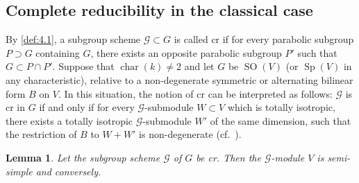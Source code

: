 \documentclass[11pt,a4paper]{article}
\theoremstyle{plain}
\newtheorem{lemma}[theorem]{Lemma}
\theoremstyle{definition}
\DeclareMathOperator{\SO}{SO}
\DeclareMathOperator{\Sp}{Sp}
\begin{document}
\subsection*{Complete reducibility in the classical case}

By \ref{def:4.1}, a subgroup scheme $\mathcal{G} \subset G$ is called cr if for every parabolic subgroup $P \supset G$ containing $G$, there exists an opposite parabolic subgroup $P'$ such that $G \subset P \cap P'$. Suppose that $\operatorname{char}(k) \neq 2$ and let $G$ be $\SO(V)$ (or $\Sp(V)$ in any characteristic), relative to a non-degenerate symmetric or alternating bilinear form $B$ on $V$. In this situation, the notion of cr can be interpreted as follows: $\mathcal{G}$ is cr in $G$ if and only if for every $\mathcal{G}$-submodule $W \subset V$ which is totally isotropic, there exists a totally isotropic $\mathcal{G}$-submodule $W'$ of the same dimension, such that the restriction of $B$ to $W + W'$ is non-degenerate (cf.~\cite[Example~3.3.3, page~206]{S3}).

\begin{lemma} \label{lem:4.15}
Let the subgroup scheme $\mathcal{G}$ of $G$ be cr. Then the $\mathcal{G}$-module $V$ is semi-simple and conversely.
\end{lemma}
\end{document}
